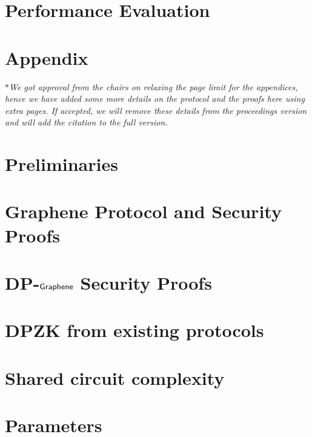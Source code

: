 \documentclass[USenglish,oneside,twocolumn]{article}
\begin{document}
\section{Performance Evaluation}
\label{sec:performancecompare}





%
\appendix
\section*{Appendix}
\textit{$\ast$We got approval from the chairs on relaxing the page limit for the appendices, hence we have added some more details on the protocol and the proofs here using extra pages. If accepted, we will remove these details from the proceedings version and will add the citation to the full version.}
%
\section{Preliminaries}
\label{app:securitydef}

\section{Graphene Protocol and Security Proofs}
\label{app:grapehene_securityproofs}

\section{DP-$\textsf{Graphene}$ Security Proofs}
\label{app:dp_grapehene_securityproofs}

\section{DPZK from existing protocols}
\label{app:dpzk_others}

\section{Shared circuit complexity}
\label{app:shared_ciruit}

\section{Parameters}
\label{app:Parameters}

\section*{ }
\label{app:DP_Protocols}

\end{document}
